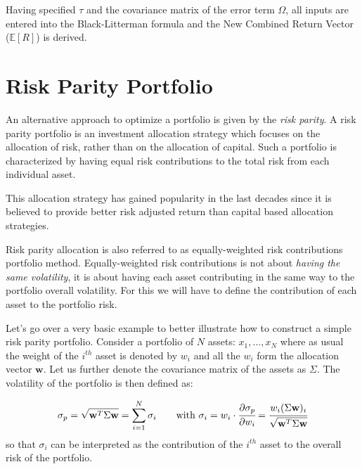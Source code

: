 Having specified $\tau$ and the covariance matrix of the error term $\Omega$, all inputs are entered into the Black-Litterman formula and the New Combined Return Vector ($\mathbb{E}[R]$) is derived. 

\section{Risk Parity Portfolio}
\label{risk-parity-portfolio}

An alternative approach to optimize a portfolio is given by the \emph{risk parity}. A risk parity portfolio is an investment allocation strategy which focuses on the allocation of risk, rather than on the allocation of capital. 
Such a portfolio is characterized by having equal risk contributions to the total risk from each individual asset. 

This allocation strategy has gained popularity in the last decades since it is believed to provide better risk adjusted return than capital based allocation strategies.

Risk parity allocation is also referred to as equally-weighted risk contributions portfolio method. Equally-weighted risk contributions is not about \emph{having the same volatility}, it is about having each asset contributing in the same way to the portfolio overall volatility. For this we will have to define the contribution of each asset to the portfolio risk. 

Let's go over a very basic example to better illustrate how to construct a simple risk parity portfolio. Consider a portfolio of \(N\) assets: \(x_{1}, \ldots, x_N\) where as usual the weight of the $i^{th}$ asset is denoted by \(w_{i}\) and all the \(w_{i}\) form the allocation vector \(\mathbf{w}\). Let us further denote the covariance matrix of the assets as \(\Sigma\). The volatility of the portfolio is then defined as:

\begin{equation} 
\sigma_p={\sqrt {\mathbf{w}^T\Sigma \mathbf{w}}} = \sum_{i=1}^{N}\sigma _{i}\qquad\textrm{with}~\sigma _{i} = w_{i}\cdot \cfrac{\partial\sigma_p}{\partial w_{i}}={\cfrac {w_{i}(\Sigma \mathbf{w})_{i}}{\sqrt {\mathbf{w}^T\Sigma \mathbf{w}}}}
\end{equation}
so that \(\sigma _{i}\) can be interpreted as the contribution of the $i^{th}$ asset to the overall risk of the portfolio.

